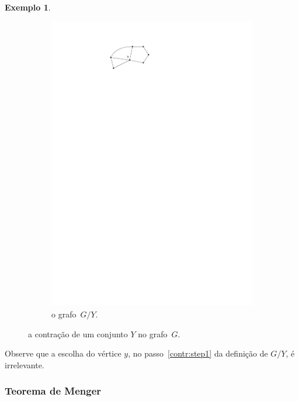 \documentclass[12pt, a4paper]{article}
\theoremstyle{definition}
\newtheorem{exem}[teor]{Exemplo}
\begin{document}
\begin{exem}
\begin{figure}[H]
\begin{subfigure}{.5\textwidth}
  \includegraphics[]{contraido.pdf}
  \caption{o grafo~$G/Y$.}
  \label{fig:contr2}
\end{subfigure}
\caption{a contração de um conjunto $Y$ no grafo~$G$.}
\label{fig:contr}
\end{figure}
\end{exem}

\noindent Observe que a escolha do vértice $y$, no passo~\ref{contr:step1} da definição de $G/Y$, é irrelevante. 


\subsubsection {Teorema de Menger}
\end{document}
